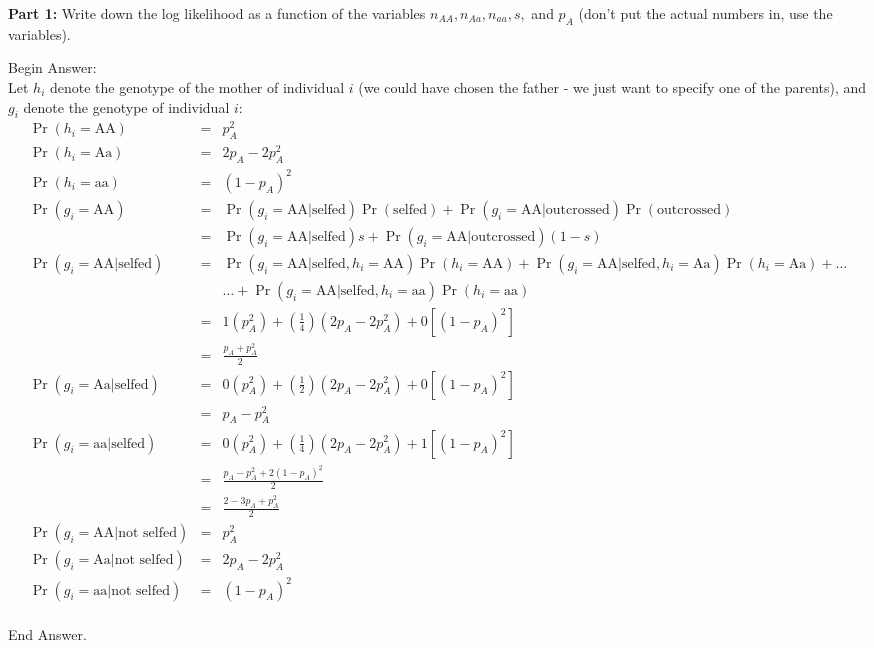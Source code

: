 \documentclass[11pt]{article}
\newcommand{\answer}[1]{{\color{red}\sc Begin Answer:\\}#1{\par\color{red}\sc End Answer.\\}}
\begin{document}
\begin{compactenum}
	\item[{\bf Part 1:}] Write down the log likelihood as a function of the variables $n_{AA}, n_{Aa}, n_{aa}, s,$ and $p_A$ (don't put the actual numbers in, use the variables).
\end{compactenum}
\answer{
Let $h_i$ denote the genotype of the mother of individual $i$ (we could have chosen the father - we just want to specify one of the parents), and $g_i$ denote the genotype of individual $i$:
\begin{eqnarray*}
	\Pr(h_i = \mbox{AA}) & = & p_A^2 \\
	\Pr(h_i = \mbox{Aa}) & = & 2p_A - 2p_A^2 \\
	\Pr(h_i = \mbox{aa}) & = & (1-p_A)^2 \\
	\Pr(g_i = \mbox{AA}) & = & \Pr(g_i=\mbox{AA}| \mbox{selfed})\Pr(\mbox{selfed}) + \Pr(g_i=\mbox{AA}| \mbox{outcrossed})\Pr(\mbox{outcrossed}) \\
					    & = & \Pr(g_i=\mbox{AA}| \mbox{selfed})s + \Pr(g_i=\mbox{AA}| \mbox{outcrossed})(1-s) \\
	\Pr(g_i=\mbox{AA}| \mbox{selfed}) & = & \Pr(g_i=\mbox{AA}| \mbox{selfed},h_i=\mbox{AA})\Pr(h_i=\mbox{AA}) + \Pr(g_i=\mbox{AA}| \mbox{selfed},h_i=\mbox{Aa})\Pr(h_i=\mbox{Aa}) + \ldots \\
		& & \ldots + \Pr(g_i=\mbox{AA}| \mbox{selfed},h_i=\mbox{aa})\Pr(h_i=\mbox{aa}) \\
		 & = & 1 \left(p_A^2\right) + \left(\frac{1}{4}\right)\left(2p_A - 2p_A^2\right) + 0 \left[(1-p_A)^2\right] \\
		 & = & \frac{p_A +p_A^2}{2}\\
	\Pr(g_i=\mbox{Aa}| \mbox{selfed}) & = & 0 \left(p_A^2\right) + \left(\frac{1}{2}\right)\left(2p_A - 2p_A^2\right) + 0 \left[(1-p_A)^2\right] \\
	& = & p_A - p_A^2 \\
\Pr(g_i=\mbox{aa}| \mbox{selfed}) & = & 0 \left(p_A^2\right) + \left(\frac{1}{4}\right)\left(2p_A - 2p_A^2\right) + 1 \left[(1-p_A)^2\right] \\
	& = & \frac{p_A-p_A^2 + 2(1-p_A)^2}{2} \\
	& = & \frac{2 - 3p_A + p_A^2}{2} \\
\Pr(g_i=\mbox{AA}| \mbox{not selfed}) & = & p_A^2 \\
\Pr(g_i=\mbox{Aa}| \mbox{not selfed}) & = & 2p_A - 2p_A^2 \\
\Pr(g_i=\mbox{aa}| \mbox{not selfed}) & = & (1-p_A)^2 \\

\end{eqnarray*}}
\end{document}
